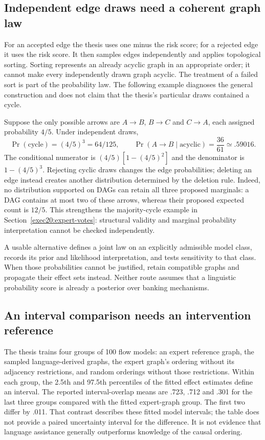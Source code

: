 \subsection{Independent edge draws need a coherent graph law}

For an accepted edge the thesis uses one minus the risk score; for a rejected
edge it uses the risk score. It then samples edges independently and applies
topological sorting. Sorting represents an already acyclic graph in an
appropriate order; it cannot make every independently drawn graph acyclic.
The treatment of a failed sort is part of the probability law. The following
example diagnoses the general construction and does not claim that the
thesis's particular draws contained a cycle.\citep{rel64molero}

Suppose the only possible arrows are $A\to B$, $B\to C$ and $C\to A$,
each assigned probability $4/5$. Under independent draws,
\[
 \Pr(\text{cycle})=(4/5)^3=64/125,\qquad
 \Pr(A\to B\mid\text{acyclic})=\frac{36}{61}\simeq.59016.
\]
The conditional numerator is $(4/5)[1-(4/5)^2]$ and the denominator
is $1-(4/5)^3$. Rejecting cyclic draws changes the edge probabilities;
deleting an edge instead creates another distribution determined by the
deletion rule. Indeed, no distribution supported on DAGs can retain all
three proposed marginals: a DAG contains at most two of these arrows, whereas
their proposed expected count is $12/5$. This strengthens the majority-cycle
example in Section~\ref{exec20:expert-votes}: structural validity and
marginal probability interpretation cannot be checked independently.

A usable alternative defines a joint law on an explicitly admissible model
class, records its prior and likelihood interpretation, and tests sensitivity
to that class. When those probabilities cannot be justified, retain compatible
graphs and propagate their effect sets instead. Neither route assumes that a
linguistic probability score is already a posterior over banking mechanisms.

\subsection{An interval comparison needs an intervention reference}

The thesis trains four groups of 100 flow models: an expert reference graph,
the sampled language-derived graphs, the expert graph's ordering without its
adjacency restrictions, and random orderings without those restrictions.
Within each group, the 2.5th and 97.5th percentiles of the fitted effect
estimates define an interval. The reported interval-overlap means are .723,
.712 and .301 for the last three groups compared with the fitted expert-graph
group. The first two differ by .011. That contrast describes these fitted
model intervals; the table does not provide a paired uncertainty interval for
the difference. It is not evidence that language assistance generally
outperforms knowledge of the causal ordering.\citep{rel64molero}

